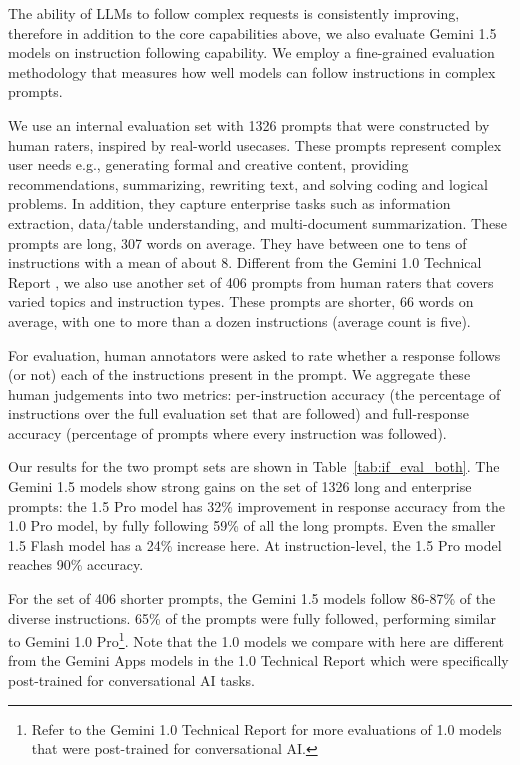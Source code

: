 The ability of LLMs to follow complex requests is consistently improving, therefore in addition to the core capabilities above, we also evaluate Gemini 1.5 models on instruction following capability. We employ a fine-grained evaluation methodology that measures how well models can follow instructions in complex prompts. 

We use an internal evaluation set with 1326 prompts that were constructed by human raters, inspired by real-world usecases. These prompts represent complex user needs e.g., generating formal and creative content, providing recommendations, summarizing, rewriting text, and solving coding and logical problems. In addition, they capture enterprise tasks such as information extraction, data/table understanding, and multi-document summarization. These prompts are long, 307 words on average. They have between one to tens of instructions with a mean of about 8. Different from the Gemini 1.0 Technical Report \cite{geminiteam2023gemini}, we also use another set of 406 prompts from human raters that covers varied topics and instruction types. These prompts are shorter, 66 words on average, with one to more than a dozen instructions (average count is five).

For evaluation, human annotators were asked to rate whether a response follows (or not) each of the instructions present in the prompt. We aggregate these human judgements into two metrics: per-instruction accuracy (the percentage of instructions over the full evaluation set that are followed) and full-response accuracy (percentage of prompts where every instruction was followed).

Our results for the two prompt sets are shown in Table~\ref{tab:if_eval_both}. The Gemini 1.5 models show strong gains on the set of 1326 long and enterprise prompts: the 1.5 Pro model has 32\% improvement in response accuracy from the 1.0 Pro model, by fully following 59\% of all the long prompts. Even the smaller 1.5 Flash model has a 24\% increase here. At instruction-level, the 1.5 Pro model reaches 90\% accuracy.

For the set of 406 shorter prompts, the Gemini 1.5 models follow 86-87\% of the diverse instructions. 65\% of the prompts were fully followed, performing similar to Gemini 1.0 Pro\footnote{Refer to the Gemini 1.0 Technical Report for more evaluations of 1.0 models that were post-trained for conversational AI.}. Note that the 1.0 models we compare with here are different from the Gemini Apps models in the 1.0 Technical Report which were specifically post-trained for conversational AI tasks.

